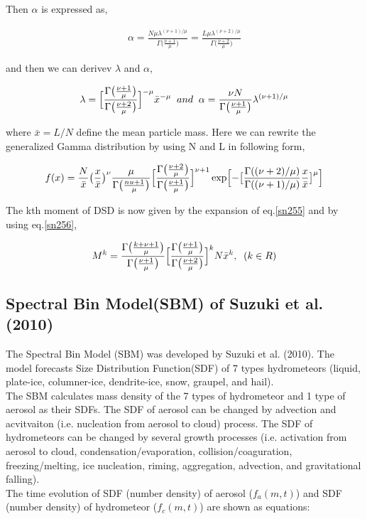 Then $\alpha$ is expressed as, 

\begin{eqnarray}
\alpha=\frac{N\mu\lambda^{(\nu+1)/\mu}}{\Gamma\bigl(\frac{\nu+1}{\mu}\bigr)}=\frac{L\mu \lambda^{(\nu+2)/\mu}}{\Gamma\bigl(\frac{\nu+2}{\mu}\bigr)}\nonumber
\end{eqnarray}

and then we can derivev $\lambda$ and $\alpha$,

\begin{eqnarray}
\lambda=\Bigl[\frac{\Gamma\bigl(\frac{\nu+1}{\mu}\bigr)}{\Gamma\bigl(\frac{\nu+2}{\mu}\bigr)}\Bigr]^{-\mu}\bar{x}^{-\mu}\;\;and\;\;\alpha=\frac{\nu N}{\Gamma\bigl(\frac{\nu+1}{\mu}\bigr)}\lambda^{(\nu+1)/\mu}\label{sn256}
\end{eqnarray}

where $\bar{x}=L/N$ define the mean particle mass. Here we can rewrite the generalized Gamma distribution by using N and L in following form,

\begin{eqnarray}
f(x)=\frac{N}{\bar{x}}\bigl(\frac{x}{\bar{x}}\bigr)^{\nu}\frac{\mu}{\Gamma\bigl(\frac{nu+1}{\mu}\bigr)}\Bigl[\frac{\Gamma\bigl(\frac{\nu+2}{\mu}\bigr)}{\Gamma\bigl(\frac{\nu+1}{\mu}\bigr)}\Bigr]^{\nu+1}\exp\Bigl[-\bigl[\frac{\Gamma((\nu+2)/\mu)}{\Gamma((\nu+1)/\mu)}\frac{x}{\bar{x}}\bigr]^{\mu}\Bigr]\label{sn257}
\end{eqnarray}

The kth moment of DSD is now given by the expansion of eq.\ref{sn255} and by using eq.\ref{sn256},

\begin{eqnarray}
M^{k}=\frac{\Gamma\bigl(\frac{k+\nu+1}{\mu}\bigr)}{\Gamma\bigl(\frac{\nu+1}{\mu}\bigr)}\Bigl[\frac{\Gamma\bigl(\frac{\nu+1}{\mu}\bigr)}{\Gamma\bigl(\frac{\nu+2}{\mu}\bigr)}\Bigr]^{k}N\bar{x}^{k},\;\;(k\in R)
\end{eqnarray}


\subsection{Spectral Bin Model(SBM) of Suzuki et al. (2010)}
The Spectral Bin Model (SBM) was developed by Suzuki et al. (2010). The model forecasts Size Distribution Function(SDF) of 7 types hydrometeors (liquid, plate-ice, columner-ice, dendrite-ice, snow, graupel, and hail). \\
The SBM calculates mass density of the 7 types of hydrometeor and 1 type of aerosol as their SDFs. The SDF of aerosol can be changed by advection and acvitvaiton (i.e. nucleation from aerosol to cloud) process. The SDF of hydrometeors can be changed by several growth processes (i.e. activation from aerosol to cloud, condensation/evaporation, collision/coaguration, freezing/melting, ice nucleation, riming, aggregation, advection, and gravitational falling). \\
The time evolution of SDF (number density) of aerosol ($f_{a}(m,t)$) and SDF (number density) of hydrometeor ($f_{c}(m,t)$) are shown as equations:

